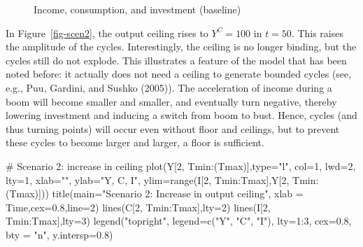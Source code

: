\documentclass[
  letterpaper,
  DIV=11,
  numbers=noendperiod]{scrreprt}
\newenvironment{Shaded}{\begin{snugshade}}{\end{snugshade}}
\newcommand{\AttributeTok}[1]{\textcolor[rgb]{0.40,0.45,0.13}{#1}}
\newcommand{\CommentTok}[1]{\textcolor[rgb]{0.37,0.37,0.37}{#1}}
\newcommand{\DecValTok}[1]{\textcolor[rgb]{0.68,0.00,0.00}{#1}}
\newcommand{\FloatTok}[1]{\textcolor[rgb]{0.68,0.00,0.00}{#1}}
\newcommand{\FunctionTok}[1]{\textcolor[rgb]{0.28,0.35,0.67}{#1}}
\newcommand{\NormalTok}[1]{\textcolor[rgb]{0.00,0.23,0.31}{#1}}
\newcommand{\SpecialCharTok}[1]{\textcolor[rgb]{0.37,0.37,0.37}{#1}}
\newcommand{\StringTok}[1]{\textcolor[rgb]{0.13,0.47,0.30}{#1}}
\begin{document}
\begin{figure}[H]


\caption{\label{fig-baseline}Income, consumption, and investment
(baseline)}

\end{figure}%

In Figure~\ref{fig-scen2}, the output ceiling rises to \(Y^C = 100\) in
\(t=50\). This raises the amplitude of the cycles. Interestingly, the
ceiling is no longer binding, but the cycles still do not explode. This
illustrates a feature of the model that has been noted before: it
actually does not need a ceiling to generate bounded cycles (see, e.g.,
Puu, Gardini, and Sushko (2005)). The acceleration of income during a
boom will become smaller and smaller, and eventually turn negative,
thereby lowering investment and inducing a switch from boom to bust.
Hence, cycles (and thus turning points) will occur even without floor
and ceilings, but to prevent these cycles to become larger and larger, a
floor is sufficient.

\begin{Shaded}
\begin{Highlighting}[]
\CommentTok{\# Scenario 2: increase in ceiling}
\FunctionTok{plot}\NormalTok{(Y[}\DecValTok{2}\NormalTok{, Tmin}\SpecialCharTok{:}\NormalTok{(Tmax)],}\AttributeTok{type=}\StringTok{"l"}\NormalTok{, }\AttributeTok{col=}\DecValTok{1}\NormalTok{, }\AttributeTok{lwd=}\DecValTok{2}\NormalTok{, }\AttributeTok{lty=}\DecValTok{1}\NormalTok{, }\AttributeTok{xlab=}\StringTok{""}\NormalTok{, }\AttributeTok{ylab=}\StringTok{"Y, C, I"}\NormalTok{, }\AttributeTok{ylim=}\FunctionTok{range}\NormalTok{(I[}\DecValTok{2}\NormalTok{, Tmin}\SpecialCharTok{:}\NormalTok{Tmax],Y[}\DecValTok{2}\NormalTok{, Tmin}\SpecialCharTok{:}\NormalTok{(Tmax)]))}
\FunctionTok{title}\NormalTok{(}\AttributeTok{main=}\StringTok{"Scenario 2: Increase in output ceiling"}\NormalTok{, }\AttributeTok{xlab =} \StringTok{\textquotesingle{}Time\textquotesingle{}}\NormalTok{,}\AttributeTok{cex=}\FloatTok{0.8}\NormalTok{,}\AttributeTok{line=}\DecValTok{2}\NormalTok{)}
\FunctionTok{lines}\NormalTok{(C[}\DecValTok{2}\NormalTok{, Tmin}\SpecialCharTok{:}\NormalTok{Tmax],}\AttributeTok{lty=}\DecValTok{2}\NormalTok{)}
\FunctionTok{lines}\NormalTok{(I[}\DecValTok{2}\NormalTok{, Tmin}\SpecialCharTok{:}\NormalTok{Tmax],}\AttributeTok{lty=}\DecValTok{3}\NormalTok{)}
\FunctionTok{legend}\NormalTok{(}\StringTok{"topright"}\NormalTok{, }\AttributeTok{legend=}\FunctionTok{c}\NormalTok{(}\StringTok{"Y"}\NormalTok{, }\StringTok{"C"}\NormalTok{, }\StringTok{"I"}\NormalTok{),}
       \AttributeTok{lty=}\DecValTok{1}\SpecialCharTok{:}\DecValTok{3}\NormalTok{, }\AttributeTok{cex=}\FloatTok{0.8}\NormalTok{, }\AttributeTok{bty =} \StringTok{"n"}\NormalTok{, }\AttributeTok{y.intersp=}\FloatTok{0.8}\NormalTok{)}
\end{Highlighting}
\end{Shaded}
\end{document}

